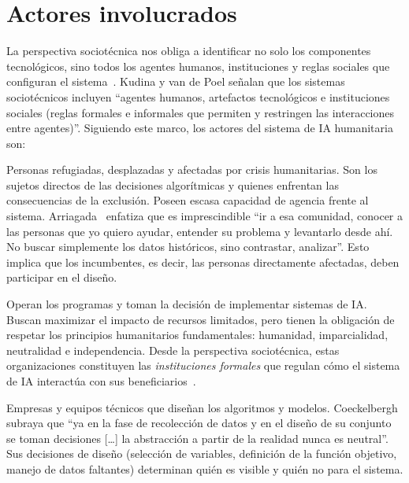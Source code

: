 \documentclass[12pt, a4paper]{article}
\begin{document}
\section{Actores involucrados}

La perspectiva sociotécnica nos obliga a identificar no solo los componentes tecnológicos, sino todos los agentes humanos, instituciones y reglas sociales que configuran el sistema~\cite{kudina2024sociotechnical}. Kudina y van de Poel señalan que los sistemas sociotécnicos incluyen ``agentes humanos, artefactos tecnológicos e instituciones sociales (reglas formales e informales que permiten y restringen las interacciones entre agentes)''. Siguiendo este marco, los actores del sistema de IA humanitaria son:

\begin{description}[leftmargin=2em, style=nextline]
    \item[\textbf{Poblaciones beneficiarias (agentes humanos: usuarios finales)}]
    Personas refugiadas, desplazadas y afectadas por crisis humanitarias. Son los sujetos directos de las decisiones algorítmicas y quienes enfrentan las consecuencias de la exclusión. Poseen escasa capacidad de agencia frente al sistema. Arriagada~\cite{arriagada2024sesgos} enfatiza que es imprescindible ``ir a esa comunidad, conocer a las personas que yo quiero ayudar, entender su problema y levantarlo desde ahí. No buscar simplemente los datos históricos, sino contrastar, analizar''. Esto implica que los incumbentes, es decir, las personas directamente afectadas, deben participar en el diseño.

    \item[\textbf{Organizaciones humanitarias: IFRC, ACNUR, PMA (agentes humanos: operadores e instituciones)}]
    Operan los programas y toman la decisión de implementar sistemas de IA. Buscan maximizar el impacto de recursos limitados, pero tienen la obligación de respetar los principios humanitarios fundamentales: humanidad, imparcialidad, neutralidad e independencia. Desde la perspectiva sociotécnica, estas organizaciones constituyen las \textit{instituciones formales} que regulan cómo el sistema de IA interactúa con sus beneficiarios~\cite{kudina2024sociotechnical}.

    \item[\textbf{Desarrolladores de tecnología (agentes humanos: diseñadores)}]
    Empresas y equipos técnicos que diseñan los algoritmos y modelos. Coeckelbergh~\cite{coeckelbergh2021etica} subraya que ``ya en la fase de recolección de datos y en el diseño de su conjunto se toman decisiones [\ldots] la abstracción a partir de la realidad nunca es neutral''. Sus decisiones de diseño (selección de variables, definición de la función objetivo, manejo de datos faltantes) determinan quién es visible y quién no para el sistema.


\end{description}
\end{document}
